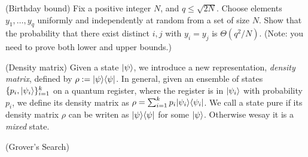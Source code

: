 \begin{questions}
\question[10] (Birthday bound) Fix a positive integer $N$, and
  $q\leq \sqrt{2N}$. Choose elements $y_1, \ldots, y_q$ uniformly and
  independently at random from a set of size $N$. Show that the
  probability that there exist distinct $i, j$ with $y_i = y_j$ is
  $\Theta(q^2/N)$. (Note: you need to prove both lower and upper bounds.)

\question (Density matrix) Given a state $\lvert \psi \rangle$, we
  introduce a new representation, \emph{density matrix}, defined by
  $\rho := \lvert \psi \rangle\langle \psi \rvert$. In general, given an ensemble of
  states $\{p_i, \lvert \psi_i \rangle\}_{i=1}^k$ on a quantum register, where
  the register is in $\lvert \psi_i \rangle$ with probability $p_i$, we define
  its density matrix as
  $\rho = \sum_{i =1}^k p_i\lvert \psi_i \rangle\langle \psi_i \rvert$. We call a state
  pure if its density matrix $\rho$ can be writen as
  $\lvert \psi \rangle\langle \psi \rvert$ for some $\lvert \psi \rangle$. Otherwise wesay it is
  a \emph{mixed} state.
  
  
\question (Grover's Search)
  
  \begin{parts}

\end{parts}
\end{questions}
